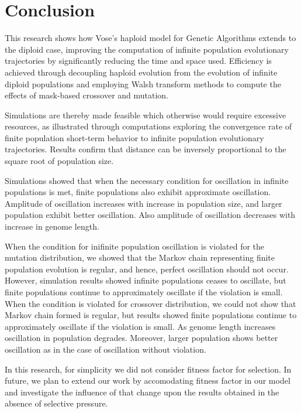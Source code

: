 \chapter{Conclusion}
This research shows how Vose's haploid model for Genetic Algorithms
extends to the diploid case, improving the computation of infinite
population evolutionary trajectories by significantly reducing the
time and space used.  Efficiency is achieved through decoupling
haploid evolution from the evolution of infinite diploid populations
and employing Walsh transform methods to compute the effects of
mask-based crossover and mutation.  

Simulations are thereby made feasible which otherwise would require
excessive resources, as illustrated through computations exploring 
the convergence rate of finite population short-term behavior to infinite population evolutionary trajectories. 
Results confirm that distance can be inversely proportional to the square root of population size.

Simulations showed that when the necessary condition for oscillation in infinite populations is met, 
finite populations also exhibit approximate oscillation. Amplitude of oscillation increases with 
increase in population size, and larger population exhibit better oscillation. Also amplitude of 
oscillation decreases with increase in genome length.

When the condition for inifinite population oscillation is violated for the mutation distribution, 
we showed that the Markov chain representing finite population evolution is regular, and hence, 
perfect oscillation should not occur. However, simulation results showed 
infinite populations ceases to oscillate, 
but finite populations continue to approximately oscillate if the violation is small. 
When the condition is violated for crossover distribution,
we could not show that Markov chain formed is regular, 
but results showed finite populations continue to approximately oscillate 
if the violation is small. As genome length increases 
oscillation in population degrades. Moreover, larger population shows better oscillation 
as in the case of oscillation without violation.

In this research, for simplicity we did not consider fitness factor for selection.  
In future, we plan to extend our work by accomodating fitness factor in our model and investigate 
the influence of that change upon the results obtained in the absence of selective pressure.



